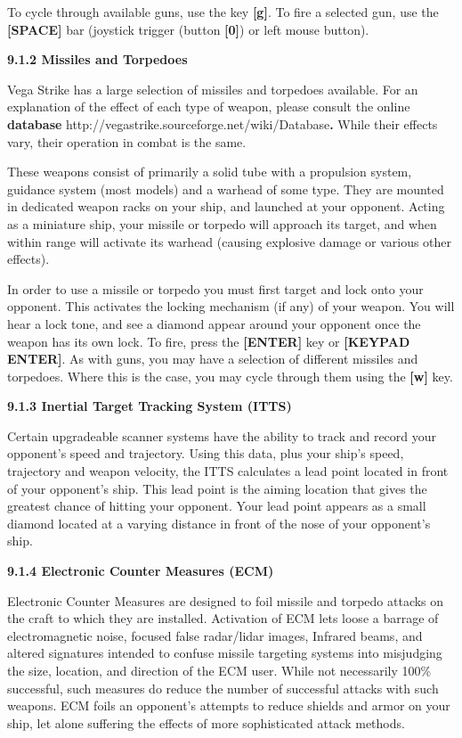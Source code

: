 \documentclass{article}
\begin{document}
To cycle through available guns, use the key \textbf{[g]}. To fire a selected gun, use the \textbf{[SPACE] }bar (joystick trigger (button \textbf{[0]}) or left mouse button). 

\textbf{9.1.2 Missiles and Torpedoes }

Vega Strike has a large selection of missiles and torpedoes available. For an explanation of the effect of each type of weapon, please consult the online \textbf{database } http://vegastrike.sourceforge.net/wiki/Database\textbf{.  }While their effects vary, their operation in combat is the same. 

These weapons consist of primarily a solid tube with a propulsion system, guidance system (most models) and a warhead of some type. They are mounted in dedicated weapon racks on your ship, and launched at your opponent. Acting as a miniature ship, your missile or torpedo will approach its target, and when within range will activate its warhead (causing explosive damage or various other effects). 

In order to use a missile or torpedo you must first target and lock onto your opponent. This activates the locking mechanism (if any) of your weapon. You will hear a lock tone, and see a diamond appear around your opponent once the weapon has its own lock. To fire, press the \textbf{[ENTER] }key or \textbf{[KEYPAD ENTER]}. As with guns, you may have a selection of different missiles and torpedoes. Where this is the case, you may cycle through them using the \textbf{[w]} key. 

\textbf{9.1.3 Inertial Target Tracking System (ITTS) }

Certain upgradeable scanner systems have the ability to track and record your opponent's speed and trajectory. Using this data, plus your ship's speed, trajectory and weapon velocity, the ITTS calculates a lead point located in front of your opponent's ship. This lead point is the aiming location that gives the greatest chance of hitting your opponent. Your lead point appears as a small diamond located at a varying distance in front of the nose of your opponent's ship. 

\textbf{}

\textbf{9.1.4 Electronic Counter Measures (ECM) }

Electronic Counter Measures are designed to foil missile and torpedo attacks on the craft to which they are installed. Activation of ECM lets loose a barrage of electromagnetic noise, focused false radar/lidar images, Infrared beams, and altered signatures intended to confuse missile targeting systems into misjudging the size, location, and direction of the ECM user. While not necessarily 100\% successful, such measures do reduce the number of successful attacks with such weapons. ECM foils an opponent's attempts to reduce shields and armor on your ship, let alone suffering the effects of more sophisticated attack methods. 
\end{document}
